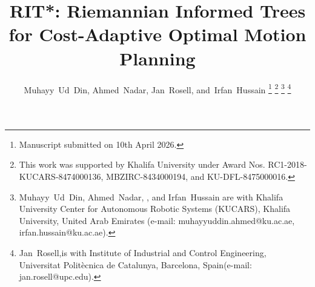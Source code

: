 \documentclass[journal]{IEEEtran}
\begin{document}
\title{RIT*: Riemannian Informed Trees for Cost-Adaptive Optimal Motion Planning}

\author{
    Muhayy~Ud~Din,
    Ahmed~Nadar,
    Jan~Rosell,
    and~Irfan~Hussain
    \thanks{Manuscript submitted on 10th April 2026.}
    \thanks{This work was supported by Khalifa University under Award
Nos. RC1-2018-KUCARS-8474000136,  MBZIRC-8434000194, and KU-DFL-8475000016. }
    \thanks{Muhayy~Ud~Din,
    Ahmed~Nadar,
, and Irfan~Hussain are with Khalifa University Center for Autonomous Robotic Systems (KUCARS), Khalifa University, United Arab Emirates (e-mail: muhayyuddin.ahmed@ku.ac.ae, 
irfan.hussain@ku.ac.ae).}%
    \thanks{Jan~Rosell,is with Institute of Industrial and Control Engineering, Universitat Politècnica de Catalunya, Barcelona, Spain(e-mail: jan.rosell@upc.edu).}
}

\maketitle
\end{document}
